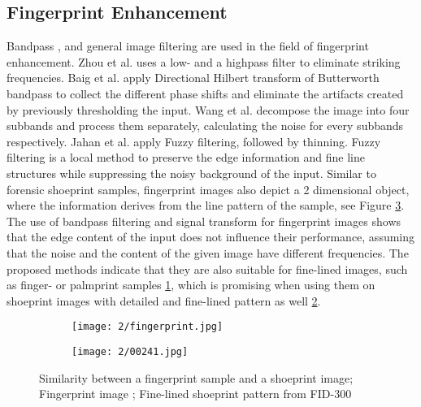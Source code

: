 \documentclass[draft,final]{vutinfth} %
\begin{document}
\subsection{Fingerprint Enhancement}
\par
Bandpass \cite{zhou2011adaptive}, \cite{baig2015enhancement} and general image filtering  \cite{jahan2017robust} are used in the field of fingerprint enhancement.
Zhou et al. \cite{zhou2011adaptive} uses a low- and a highpass filter to eliminate striking frequencies. 
Baig et al. \cite{baig2015enhancement} apply Directional Hilbert transform of Butterworth bandpass to collect the different phase shifts and eliminate the artifacts created by previously thresholding the input.
Wang et al. \cite{wang2014enhanced} decompose the image into four subbands and process them separately, calculating the noise for every subbands respectively.
Jahan et al. \cite{jahan2017robust} apply Fuzzy filtering, followed by thinning.
Fuzzy filtering is a local method to preserve the edge information and fine line structures while suppressing the noisy background of the input.
Similar to forensic shoeprint samples, fingerprint images also depict a 2 dimensional object, where the information derives from the line pattern of the sample, see Figure \ref{fig:rw:fingerprint}.
The use of bandpass filtering and signal transform for fingerprint images shows that the edge content of the input does not influence their performance, assuming that the noise and the content of the given image have different frequencies.
The proposed methods indicate that they are also suitable for fine-lined images, such as finger- or palmprint samples \ref{fig:rw:fp}, which is promising when using them on shoeprint images with detailed and fine-lined pattern as well \ref{fig:rw:ref}. 

\begin{figure}[h]
  \centering
  \begin{subfigure}[t]{0.4\columnwidth}
    \centering
    \texttt{[image: 2/fingerprint.jpg]}
    \subcaption{}
    \label{fig:rw:fp}
  \end{subfigure}
  \begin{subfigure}[t]{0.4\columnwidth}
    \centering
    \texttt{[image: 2/00241.jpg]}
    \subcaption{}
    \label{fig:rw:ref}
  \end{subfigure}
  \caption{Similarity between a fingerprint sample and a shoeprint  image;
		 Fingerprint image \cite{van2016fingerprint};  Fine-lined shoeprint pattern from FID-300  \cite{kortylewski2014unsupervised}}
  \label{fig:rw:fingerprint} %
\end{figure}
\end{document}
